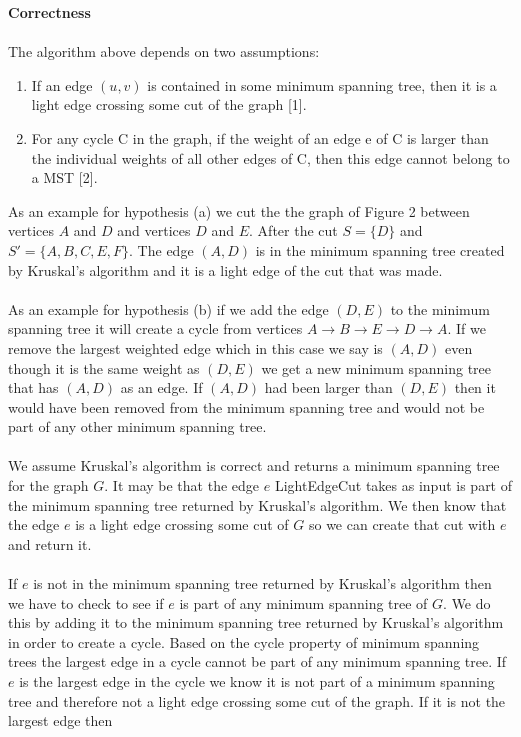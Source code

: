 \documentclass[12pt]{article}
\begin{document}
\begin{enumerate}
	\textbf{Correctness}\\
	\\
	The algorithm above depends on two assumptions:
	\begin{enumerate}
		\item If an edge $(u, v)$ is contained in some minimum spanning tree, then it is a light edge crossing some cut of the graph [1].
		\item For any cycle C in the graph, if the weight of an edge e of C is larger than the individual weights of all other edges of C, then this edge cannot belong to a MST [2].
	\end{enumerate}
	As an example for hypothesis (a) we cut the the graph of Figure 2 between vertices $A$ and $D$ and vertices $D$ and $E$.  After the cut $S = \{D\}$ and $S'=\{A,B,C,E,F\}$.
	The edge $(A,D)$ is in the minimum spanning tree created by Kruskal's algorithm and it is a light edge of the cut that was made.\\
	\\
	As an example for hypothesis (b) if we add the edge $(D,E)$ to the minimum spanning tree it will create a cycle from vertices $A \rightarrow B \rightarrow E \rightarrow D \rightarrow A$.
	If we remove the largest weighted edge which in this case we say is $(A,D)$ even though it is the same weight as $(D,E)$ we get a new minimum spanning tree that has $(A,D)$ as an edge.  
	If $(A,D)$ had been larger than $(D,E)$ then it would have been removed from the minimum spanning tree and would not be part of any other minimum spanning tree.\\
	\\ 
	We assume Kruskal's algorithm is correct and returns a minimum spanning tree for the graph $G$.  
	It may be that the edge $e$ LightEdgeCut takes as input is part of the minimum spanning tree returned by Kruskal's algorithm.  
	We then know that the edge $e$ is a light edge crossing some cut of $G$ so we can create that cut with $e$ and return it. \\
	\\ 
	If $e$ is not in the minimum spanning tree returned by Kruskal's algorithm then we have to check to see if $e$ is part of any minimum spanning tree of $G$.
	We do this by adding it to the minimum spanning tree returned by Kruskal's algorithm in order to create a cycle.  
	Based on the cycle property of minimum spanning trees the largest edge in a cycle cannot be part of any minimum spanning tree.  If $e$ is the largest edge
	in the cycle we know it is not part of a minimum spanning tree and therefore not a light edge crossing some cut of the graph.  If it is not the largest edge then

\end{enumerate}
\end{document}
